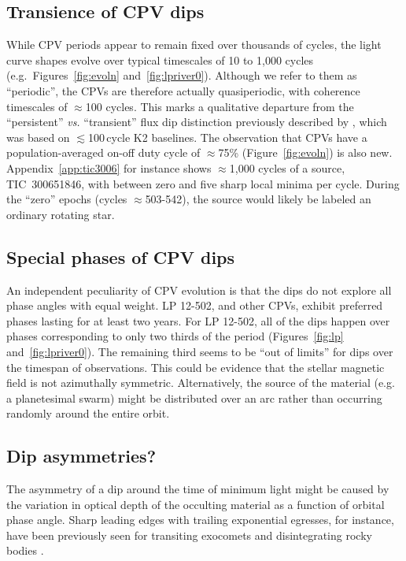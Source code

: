 \documentclass[11pt,twocolumn,tighten,linenumbers]{aastex63}
\begin{document}
\subsection{Transience of CPV dips}

While CPV periods appear to remain fixed over thousands of cycles, the
light curve shapes evolve over typical timescales of 10 to 1{,}000
cycles (e.g.\ Figures~\ref{fig:evoln} and~\ref{fig:lpriver0}).
Although we refer to them as ``periodic'', the CPVs are therefore
actually quasiperiodic, with coherence timescales of $\approx$100
cycles.  This marks a qualitative departure from the ``persistent''
{\it vs.} ``transient'' flux dip distinction previously described by
\citet{2017AJ....153..152S}, which was based on $\lesssim$100\,cycle
K2 baselines.  The observation that CPVs have a population-averaged
on-off duty cycle of $\approx$75\% (Figure~\ref{fig:evoln}) is also
new.  Appendix~\ref{app:tic3006} for instance shows $\approx$1{,}000
cycles of a source, TIC~300651846, with between zero and five sharp
local minima per cycle.  During the ``zero'' epochs (cycles
$\approx$503-542), the source would likely be labeled an ordinary
rotating star.


\subsection{Special phases of CPV dips}

An independent peculiarity of CPV evolution is that the dips do not
explore all phase angles with equal weight.  LP 12-502, and other
CPVs, exhibit preferred phases lasting for at least two years.  For LP
12-502, all of the dips happen over phases corresponding to only two
thirds of the period (Figures~\ref{fig:lp} and~\ref{fig:lpriver0}).
The remaining third seems to be ``out of limits'' for dips over the
timespan of observations.  This could be evidence that the stellar
magnetic field is not azimuthally symmetric.  Alternatively, the
source of the material (e.g. a planetesimal swarm) might be
distributed over an arc rather than occurring randomly around the
entire orbit.  


\subsection{Dip asymmetries?}

The asymmetry of a dip around the time of minimum light might be
caused by the variation in optical depth of the occulting material as
a function of orbital phase angle.  Sharp leading edges with trailing
exponential egresses, for instance, have been previously seen for
transiting exocomets and disintegrating rocky bodies
\citep[e.g.][]{2012ApJ...752....1R,2012A&A...545L...5B,2015Natur.526..546V,2019A&A...625L..13Z}.
\end{document}
